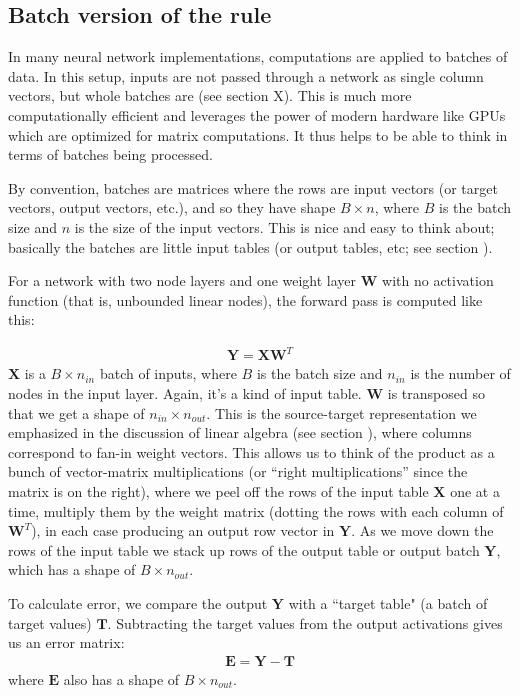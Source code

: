 \subsection{Batch version of the rule}

In many neural network implementations, computations are applied to batches of data. In this setup, inputs are not passed through a network as single column vectors, but whole batches are (see section X). This is much more computationally efficient and leverages the power of modern hardware like GPUs which are optimized for matrix computations.  It thus helps to be able to think in terms of batches being processed.

By convention, batches are matrices where the rows are input vectors (or target vectors, output vectors, etc.), and so they have shape $B \times n$, where $B$ is the batch size and $n$ is the size of the input vectors. This is nice and easy to think about; basically the batches are little input tables (or output tables, etc; see section ).


For a network with two node layers and one weight layer $\mathbf{W}$ with no activation function (that is, unbounded linear nodes), the forward pass is computed like this:

\begin{eqnarray}
\mathbf{Y} = \mathbf{X} \mathbf{W}^T
\end{eqnarray}
$\mathbf{X}$ is a  $B \times n_{in}$ batch of inputs, where $B$ is the batch size and $n_{in}$ is the number of nodes in the input layer. Again, it's a kind of input table. $\mathbf{W}$ is transposed so that we get a shape of $n_{in} \times n_{out}$. This is the source-target representation we emphasized in the discussion of linear algebra (see section ), where columns correspond to fan-in weight vectors. This allows us to think of the product as a bunch of vector-matrix multiplications (or ``right multiplications'' since the matrix is on the right), where we peel off the rows of the input table $\mathbf{X}$ one at a time, multiply them by the weight matrix (dotting the rows with each column of $\mathbf{W}^T$), in each case producing an output row vector in $\mathbf{Y}$. As we move down the rows of the input table we stack up rows of the output table or output batch $\mathbf{Y}$, which has a shape of $B \times n_{out}$.

To calculate error, we compare the output $\mathbf{Y}$ with a ``target table" (a batch of target values) $\mathbf{T}$. Subtracting the target values from the output activations gives us an error matrix:
\begin{eqnarray}
\mathbf{E} = \mathbf{Y} - \mathbf{T}
\end{eqnarray}
where $\mathbf{E}$ also has a shape of $B \times n_{out}$.

